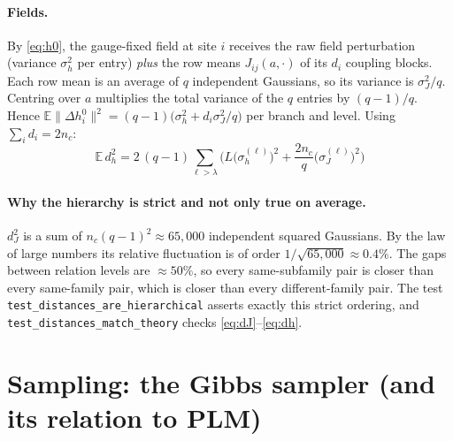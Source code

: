 \documentclass[11pt,a4paper]{article}
\newcommand{\E}{\mathbb{E}}
\begin{document}
\paragraph{Fields.} By \eqref{eq:h0}, the gauge-fixed field at site $i$ receives the raw field
perturbation (variance $\sigma_h^2$ per entry) \emph{plus} the row means $J_{ij}(a,\cdot)$ of its
$d_i$ coupling blocks. Each row mean is an average of $q$ independent Gaussians, so its variance is
$\sigma_J^2/q$. Centring over $a$ multiplies the total variance of the $q$ entries by $(q-1)/q$. Hence
$\E\|\Delta h^0_i\|^2 = (q-1)\big(\sigma_h^2 + d_i\sigma_J^2/q\big)$ per branch and level. Using
$\sum_i d_i = 2n_c$:
\begin{equation}\label{eq:dh}
\boxed{\;\E\,d_h^2 = 2\,(q-1)\sum_{\ell>\lambda}\Big(L\big(\sigma_h^{(\ell)}\big)^2 + \frac{2n_c}{q}\big(\sigma_J^{(\ell)}\big)^2\Big)\;}
\end{equation}

\paragraph{Why the hierarchy is strict and not only true on average.} $d_J^2$ is a sum of
$n_c(q-1)^2\approx 65{,}000$ independent squared Gaussians. By the law of large numbers its relative
fluctuation is of order $1/\sqrt{65{,}000}\approx0.4\%$. The gaps between relation levels are
$\approx50\%$, so every same-subfamily pair is closer than every same-family pair, which is closer
than every different-family pair. The test \texttt{test\_distances\_are\_hierarchical} asserts exactly
this strict ordering, and \texttt{test\_distances\_match\_theory} checks \eqref{eq:dJ}--\eqref{eq:dh}.

\section{Sampling: the Gibbs sampler (and its relation to PLM)}\label{sec:gibbs}
\end{document}
